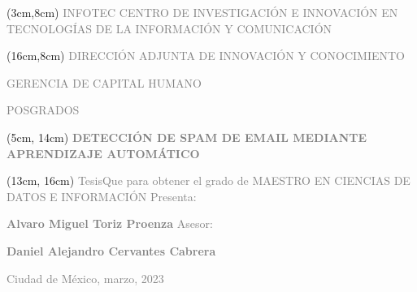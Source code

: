 \newpage{\ }
\thispagestyle{empty}

\begin{titlepage}

\begin{textblock*}{9.5cm}(3cm,8cm) %
	\renewcommand{\baselinestretch}{1}
   \flushright\normalsize\textcolor{gray}{INFOTEC CENTRO DE INVESTIGACIÓN E INNOVACIÓN EN TECNOLOGÍAS DE LA INFORMACIÓN Y COMUNICACIÓN}
\end{textblock*}

\begin{textblock*}{8cm}(16cm,8cm) %
	\renewcommand{\baselinestretch}{1}
	\flushleft\footnotesize\textcolor{gray}{DIRECCIÓN ADJUNTA DE INNOVACIÓN Y CONOCIMIENTO}\par
	\textcolor{gray}{GERENCIA DE CAPITAL HUMANO} \par
	\textcolor{gray}{POSGRADOS}
\end{textblock*}

\begin{textblock*}{8cm}(5cm, 14cm)
	\renewcommand{\baselinestretch}{1}
	\center\Huge\textcolor{gray}{\textbf{DETECCIÓN DE SPAM DE EMAIL MEDIANTE APRENDIZAJE AUTOMÁTICO}}
\end{textblock*}

\begin{textblock*}{10cm}(13cm, 16cm)
	\renewcommand{\baselinestretch}{1}
	\flushleft\normalsize\textcolor{gray}{Tesis\newline Que para obtener el grado de MAESTRO EN CIENCIAS DE DATOS E INFORMACIÓN}
	\vspace{2em}
	\flushleft\normalsize\textcolor{gray}{Presenta:}\par
	\flushleft\normalsize\textcolor{gray}{\textbf{Alvaro Miguel Toriz Proenza}}
	\flushleft\normalsize\textcolor{gray}{Asesor:}\par
	\flushleft\normalsize\textcolor{gray}{\textbf{Daniel Alejandro Cervantes Cabrera}}\par
	\vspace{8em}
	\flushleft\normalsize\textcolor{gray}{Ciudad de México, marzo, 2023}\par
\end{textblock*}
\end{titlepage}
\newpage{\ }